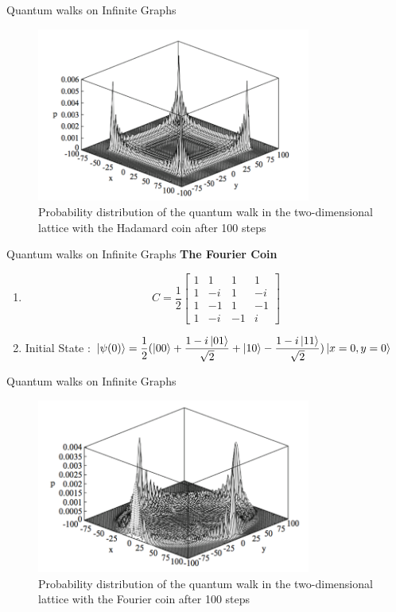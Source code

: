 \documentclass[xcolor=svgnames]{beamer}
\begin{document}
\begin{frame}{Quantum walks on Infinite Graphs}
\begin{figure}
    \includegraphics[width = 9cm]{Hadamard2D.png}
    \caption{Probability distribution of the quantum walk in the two-dimensional lattice with the Hadamard coin after 100 steps}
\end{figure}
    
\end{frame}

\begin{frame}{Quantum walks on Infinite Graphs}
\textbf{ The Fourier Coin}
\begin{enumerate}
    \item
    $$C = \frac{1}{2}\begin{bmatrix}
                                1 & 1 & 1 & 1\\
                                    1 & -i & 1 & -i\\
                                    1 & -1 & 1 & -1\\
                                    1 & -i & -1 & i
                                    \end{bmatrix}$$
    \item Initial State : $\ket{\psi(0)} =\dfrac{1}{2}(\ket{00} + \dfrac{1-i\ket{01}}{\sqrt{2}} + \ket{10} - \dfrac{1-i\ket{11}}{\sqrt{2}})\ket{x=0,y=0}$
    
\end{enumerate}
    
\end{frame}

\begin{frame}{Quantum walks on Infinite Graphs}
\begin{figure}
    \includegraphics[width = 9cm]{Fourier2D.png}
    \caption{Probability distribution of the quantum walk in the two-dimensional lattice with the Fourier coin after 100 steps}
\end{figure}
    
\end{frame}
\end{document}
